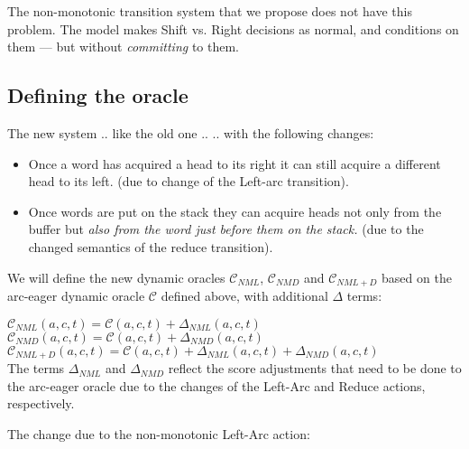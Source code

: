 \documentclass[11pt,letterpaper]{article}
\begin{document}
The non-monotonic transition system that we propose does not have this problem.
The model makes Shift vs. Right decisions as normal, and conditions on them --- but
without \emph{committing} to them.

\subsection{Defining the oracle}

The new system .. like the old one ..
.. with the following changes:
\begin{itemize}
   \item Once a word has acquired a head to its right it can still acquire a
      different head to its left.  (due to change of the Left-arc transition).
   \item Once words are put on the stack they can acquire heads not only from
      the buffer but \textit{also from the word just before them on the
      stack.} (due to the changed semantics of the reduce transition).
\end{itemize}

We will define the new dynamic oracles $\mathcal{C}_{NML}$,
$\mathcal{C}_{NMD}$ and $\mathcal{C}_{NML+D}$ based on the arc-eager dynamic
oracle $\mathcal{C}$ defined above, with additional $\Delta$ terms:

\noindent$\mathcal{C}_{NML}(a,c,t) = \mathcal{C}(a,c,t) + \Delta_{NML}(a,c,t)$\\

\noindent$\mathcal{C}_{NMD}(a,c,t) = \mathcal{C}(a,c,t) + \Delta_{NMD}(a,c,t)$\\

\noindent$\mathcal{C}_{NML+D}(a,c,t) = \mathcal{C}(a,c,t) + \Delta_{NML}(a,c,t) + \Delta_{NMD}(a,c,t)$\\

The terms $\Delta_{NML}$ and $\Delta_{NMD}$ reflect the score adjustments that
need to be done to the arc-eager oracle due to the changes of the Left-Arc and
Reduce actions, respectively.

The change due to the non-monotonic Left-Arc action:
\end{document}
